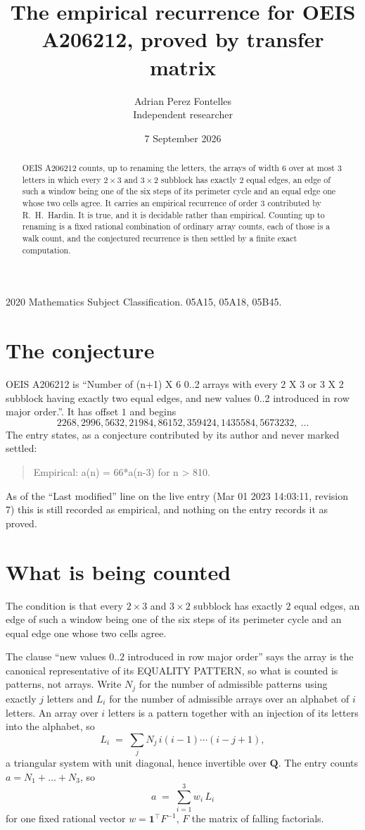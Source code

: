 \documentclass[11pt,a4paper]{article}
\title{The empirical recurrence for OEIS A206212, proved by transfer matrix}
\author{Adrian Perez Fontelles\\ \small Independent researcher}
\date{7 September 2026}
\theoremstyle{plain}
\theoremstyle{definition}
\begin{document}
\maketitle

\begin{abstract}
OEIS A206212 counts, up to renaming the letters, the arrays of width $6$ over at most $3$
letters in which every $2\times3$ and $3\times2$ subblock has exactly $2$ equal edges, an edge of such a window being one of the six steps of its perimeter cycle and an equal edge one whose two cells agree. It carries an empirical recurrence of order $3$ contributed by
R.~H.~Hardin. It is true, and it is decidable rather than empirical. Counting up to renaming is
a fixed rational combination of ordinary array counts, each of those is a walk count, and the
conjectured recurrence is then settled by a finite exact computation.
\end{abstract}

\noindent\small 2020 Mathematics Subject Classification. 05A15, 05A18, 05B45.\normalsize

\section{The conjecture}

OEIS A206212 is ``Number of (n+1) X 6 0..2 arrays with every 2 X 3 or 3 X 2 subblock having exactly two equal edges, and new values 0..2 introduced in row major order.''. It has offset $1$ and begins
\[
2268, 2996, 5632, 21984, 86152, 359424, 1435584, 5673232,\ \dots
\]
The entry states, as a conjecture contributed by its author and never marked settled:
\begin{quote}
Empirical: a(n) = 66*a(n-3) for n > 810.
\end{quote}
As of the ``Last modified'' line on the live entry (Mar 01 2023 14:03:11, revision 7) this is still
recorded as empirical, and nothing on the entry records it as proved.

\section{What is being counted}

The condition is that every $2\times3$ and $3\times2$ subblock has exactly $2$ equal edges, an edge of such a window being one of the six steps of its perimeter cycle and an equal edge one whose two cells agree.

The clause ``new values $0..2$ introduced in row major order'' says the array is the
canonical representative of its EQUALITY PATTERN, so what is counted is patterns, not arrays.
Write $N_j$ for the number of admissible patterns using exactly $j$ letters and $L_i$ for the
number of admissible arrays over an alphabet of $i$ letters. An array over $i$ letters is a
pattern together with an injection of its letters into the alphabet, so
\[
L_i\;=\;\sum_j N_j\,i(i-1)\cdots(i-j+1),
\]
a triangular system with unit diagonal, hence invertible over $\mathbf{Q}$. The entry counts
$a=N_1+\dots+N_{3}$, so
\[
a\;=\;\sum_{i=1}^{3}w_i\,L_i
\]
for one fixed rational vector $w=\mathbf{1}^{\!\top}F^{-1}$, $F$ the matrix of falling
factorials.
\end{document}

